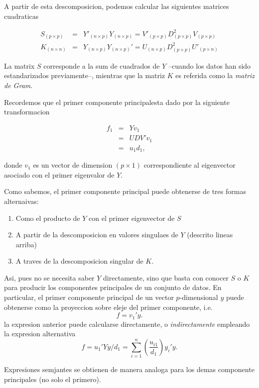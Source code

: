 \documentclass[11pt,]{article}
\begin{document}
A partir de esta descomposicion, podemos calcular las siguientes
matrices cuadraticas

\begin{eqnarray}
S_{(p\times p)} & = & Y'_{(n\times p)}Y_{(n\times p)} = V'_{(p\times p)} D^{2}_{(p\times p)} V_{(p\times p)} \\
K_{(n\times n)} & = & Y_{(n\times p)}Y_{(n\times p)}'
= U_{(n\times p)} D^{2}_{(p\times p)} U'_{(p\times n)} 
\end{eqnarray}

La matrix \(S\) corresponde a la sum de cuadrados de \(Y\) --cuando los
datos han sido estandarizados previamente--, mientras que la matriz
\(K\) es referida como la \emph{matriz de Gram}.

Recordemos que el primer componente principalesta dado por la siguiente
transformacion

\begin{eqnarray}
f_1 & = & Y v_{1} \\
    & = & UDV' v_{1} \\
    & = & u_{1} d_{1},
\end{eqnarray}

donde \(v_{1}\) es un vector de dimension \((p\times 1)\)
correspondiente al eigenvector asociado con el primer eigenvalor de
\(Y\).

Como sabemos, el primer componente principal puede obtenerse de tres
formas alternaivas:

\begin{enumerate}
\def\labelenumi{\alph{enumi}.}
\item
  Como el producto de \(Y\) con el primer eigenvector de \(S\)
\item
  A partir de la descomposicion en valores singulaes de \(Y\) (descrito
  lineas arriba)
\item
  A traves de la descomposicion singular de \(K\).
\end{enumerate}

Asi, pues no se necesita saber \(Y\) directamente, sino que basta con
conocer \(S\) o \(K\) para producir los componentes principales de un
conjunto de datos. En particular, el primer componente principal de un
vector \(p\)-dimensional \(y\) puede obtenerse como la proyeccion sobre
eleje del primer componente, i.e. \[
f=v_{1}'y.
\] la expresion anterior puede calcularse directamente, o
\emph{indirectamente} empleando la expresion alternativa \[
f=u_{1}'Yy/d_1=\sum_{i=1}^{n}\left( \frac{u_{i1}}{d_1}\right)y_{i}'y.
\]

Expresiones semjantes se obtienen de manera analoga para los demas
componente principales (no solo el primero).
\end{document}
